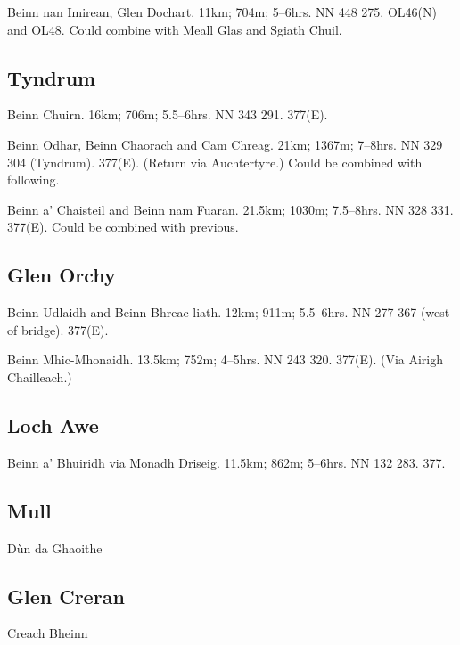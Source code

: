 \begin{munros}
\item
Beinn nan Imirean, Glen Dochart.  11km; 704m; 5--6hrs.  NN 448 275.  OL46(N) and
OL48.  Could combine with Meall Glas and Sgiath Chuil.
\end{munros}


\subsection{Tyndrum}

\begin{munros}
\item
Beinn Chuirn.  16km; 706m; 5.5--6hrs.  NN 343 291.  377(E).

\item
Beinn Odhar, Beinn Chaorach and Cam Chreag.  21km; 1367m; 7--8hrs.  NN 329 304
(Tyndrum).  377(E).  (Return via Auchtertyre.)  Could be combined with following.

\item
Beinn a' Chaisteil and Beinn nam Fuaran.  21.5km; 1030m; 7.5--8hrs.  NN 328
331.  377(E).  Could be combined with previous. 
\end{munros}


\subsection{Glen Orchy}

\begin{munros}
\item
Beinn Udlaidh and Beinn Bhreac-liath.  12km; 911m; 5.5--6hrs.  NN 277 367
(west of bridge).  377(E).  \tick

\item
Beinn Mhic-Mhonaidh.  13.5km; 752m; 4--5hrs.  NN 243 320.  377(E).  (Via
Airigh Chailleach.)
\end{munros}


\subsection{Loch Awe}

\begin{munros}
\item\target
Beinn a' Bhuiridh via Monadh Driseig.  11.5km; 862m; 5--6hrs.  NN 132 283.
377.
\end{munros}


\subsection{Mull}

Dùn da Ghaoithe


\subsection{Glen Creran}

Creach Bheinn
